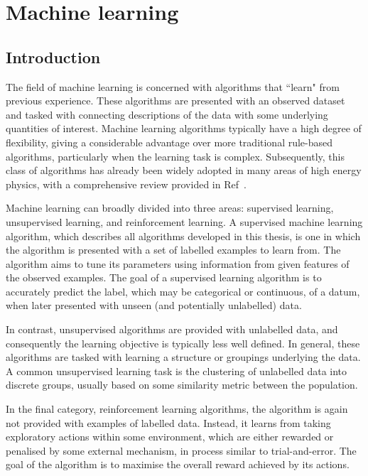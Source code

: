 \chapter{Machine learning}
\label{chap:machineLearning}

\section{Introduction}

The field of machine learning is concerned with algorithms that ``learn" from previous experience. 
These algorithms are presented with an observed dataset and tasked with connecting descriptions of the data with some underlying quantities of interest. Machine learning algorithms typically have a high degree of flexibility, giving a considerable advantage over more traditional rule-based algorithms, particularly when the learning task is complex.
Subsequently, this class of algorithms has already been widely adopted in many areas of high energy physics, with a comprehensive review provided in Ref~\cite{ml_in_hep}.

Machine learning can broadly divided into three areas: supervised learning, unsupervised learning, and reinforcement learning. A supervised machine learning algorithm, which describes all algorithms developed in this thesis, is one in which the algorithm is presented with a set of labelled examples to learn from. The algorithm aims to tune its parameters using information from given features of the observed examples. The goal of a supervised learning algorithm is to accurately predict the label, which may be categorical or continuous, of a datum, when later presented with unseen (and potentially unlabelled) data. 

In contrast, unsupervised algorithms are provided with unlabelled data, and consequently the learning objective is typically less well defined. In general, these algorithms are tasked with learning a structure or groupings underlying the data. A common unsupervised learning task is the clustering of unlabelled data into discrete groups, usually based on some similarity metric between the population. %

In the final category, reinforcement learning algorithms, the algorithm is again not provided with examples of labelled data. Instead, it learns from taking exploratory actions within some environment, which are either rewarded or penalised by some external mechanism, in process similar to trial-and-error. The goal of the algorithm is to maximise the overall reward achieved by its actions. 

